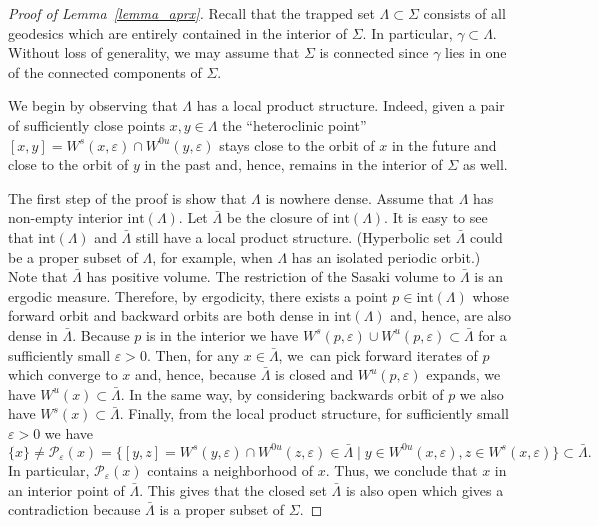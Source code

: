 \documentclass[10pt]{amsart}
\let\sep\mid
\newcommand{\Int}{\mathrm{int}}
\theoremstyle{definition}
\let\eps\varepsilon
\renewcommand{\>}{{\rangle}}
\newcommand{\<}{{\langle}}
\begin{document}
\begin{proof}[Proof of Lemma~\ref{lemma_aprx}]
Recall that the trapped set $\Lambda\subset\Sigma$ consists of all geodesics which are entirely contained in the interior of $\Sigma$. In particular, $\gamma\subset\Lambda$. Without loss of generality, we may assume that $\Sigma$ is connected since $\gamma$ lies in one of the connected components of $\Sigma$.

We begin by observing that $\Lambda$ has a local product structure. Indeed, given a pair of sufficiently close points $x,y\in\Lambda$ the ``heteroclinic point'' $[x,y]= W^s(x,\eps)\cap W^{0u}(y,\eps)$ stays close to the orbit of $x$ in the future and close to the orbit of $y$ in the past and, hence, remains in the interior of $\Sigma$ as well.

The first step of the proof is show that $\Lambda$ is nowhere dense. Assume that $\Lambda$ has non-empty interior $\Int(\Lambda)$. Let $\bar\Lambda$ be the closure of $\Int(\Lambda)$. It is easy to see that $\Int(\Lambda)$ and $\bar\Lambda$ still have a local product structure. (Hyperbolic set $\bar\Lambda$ could be a proper subset of $\Lambda$, for example, when $\Lambda$ has an isolated periodic orbit.) Note that $\bar\Lambda$ has positive volume. The restriction of the Sasaki volume to $\bar \Lambda$ is an ergodic measure. Therefore, by ergodicity, there exists a point $p\in \Int(\Lambda)$ whose forward orbit and backward orbits are both dense in $\Int(\Lambda)$ and, hence, are also dense in $\bar\Lambda$. Because $p$ is in the interior we have $W^s(p,\eps)\cup W^u(p,\eps)\subset\bar\Lambda$ for a sufficiently small $\eps>0$. Then, for any $x\in\bar\Lambda$, we~can pick forward iterates of $p$ which converge to $x$ and, hence, because $\bar\Lambda$ is closed and $W^u(p,\eps)$ expands, we have $W^u(x)\subset \bar\Lambda$. In the same way, by considering backwards orbit of $p$ we also have $W^s(x)\subset \bar\Lambda$. Finally, from the local product structure, for sufficiently small $\varepsilon>0$ we have\vspace*{-3pt}\enlargethispage{.5\baselineskip}
\[
\{x\}\neq\mathcal P_{\varepsilon}(x) = \bigl\{[y,z]=W^s(y,\varepsilon)\cap W^{0u}(z,\varepsilon)\in\bar\Lambda \sep y\in W^{0u}(x,\varepsilon), z\in W^{s}(x,\varepsilon)\bigr\}\subset\bar\Lambda.
\] In particular, $\mathcal P_{\varepsilon}(x)$ contains a neighborhood of $x$. Thus, we conclude that $x$ in an interior point of $\bar\Lambda$. This gives that the closed set $\bar\Lambda$ is also open which gives a contradiction because $\bar\Lambda$ is a proper subset of $\Sigma$.


\end{proof}
\end{document}
